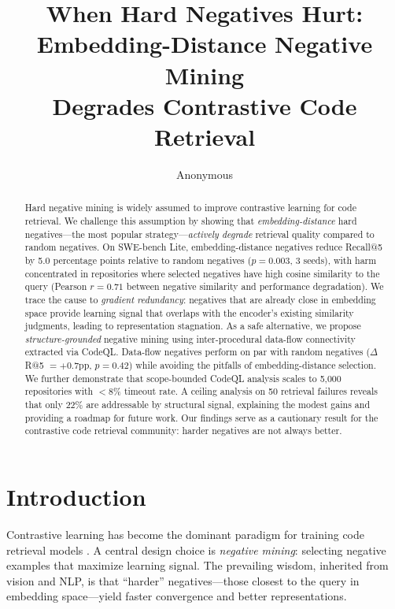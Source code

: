\documentclass[11pt,a4paper]{article}
\title{When Hard Negatives Hurt: Embedding-Distance Negative Mining\\Degrades Contrastive Code Retrieval}
\author{Anonymous}
\date{}
\begin{document}
\maketitle

\begin{abstract}
Hard negative mining is widely assumed to improve contrastive learning for code retrieval.
We challenge this assumption by showing that \emph{embedding-distance} hard negatives---the most popular strategy---\emph{actively degrade} retrieval quality compared to random negatives.
On SWE-bench Lite, embedding-distance negatives reduce Recall@5 by 5.0 percentage points relative to random negatives ($p{=}0.003$, 3 seeds), with harm concentrated in repositories where selected negatives have high cosine similarity to the query (Pearson $r{=}0.71$ between negative similarity and performance degradation).
We trace the cause to \emph{gradient redundancy}: negatives that are already close in embedding space provide learning signal that overlaps with the encoder's existing similarity judgments, leading to representation stagnation.
As a safe alternative, we propose \emph{structure-grounded} negative mining using inter-procedural data-flow connectivity extracted via CodeQL.
Data-flow negatives perform on par with random negatives ($\Delta$R@5 $= +0.7$pp, $p{=}0.42$) while avoiding the pitfalls of embedding-distance selection.
We further demonstrate that scope-bounded CodeQL analysis scales to 5,000 repositories with $<$8\% timeout rate.
A ceiling analysis on 50 retrieval failures reveals that only 22\% are addressable by structural signal, explaining the modest gains and providing a roadmap for future work.
Our findings serve as a cautionary result for the contrastive code retrieval community: harder negatives are not always better.
\end{abstract}

\section{Introduction}

Contrastive learning has become the dominant paradigm for training code retrieval models \cite{guo2022unixcoder,jimenez2024swebench}.
A central design choice is \emph{negative mining}: selecting negative examples that maximize learning signal.
The prevailing wisdom, inherited from vision and NLP, is that ``harder'' negatives---those closest to the query in embedding space---yield faster convergence and better representations.
\end{document}
